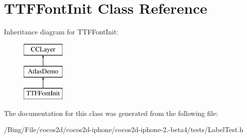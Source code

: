 \hypertarget{interface_t_t_f_font_init}{\section{T\-T\-F\-Font\-Init Class Reference}
\label{interface_t_t_f_font_init}
}
Inheritance diagram for T\-T\-F\-Font\-Init\-:\begin{figure}[H]
\begin{center}
\leavevmode
\includegraphics[height=3.000000cm]{interface_t_t_f_font_init}
\end{center}
\end{figure}


The documentation for this class was generated from the following file\-:\begin{DoxyCompactItemize}
\item 
/\-Bing/\-File/cocos2d/cocos2d-\/iphone/cocos2d-\/iphone-\/2.-\/beta4/tests/Label\-Test.\-h\end{DoxyCompactItemize}

